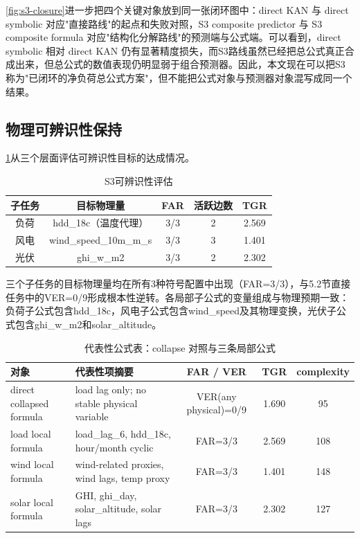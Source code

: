 \cref{fig:s3-closure}进一步把四个关键对象放到同一张闭环图中：direct KAN 与 direct symbolic 对应"直接路线"的起点和失败对照，S3 composite predictor 与 S3 composite formula 对应"结构化分解路线"的预测端与公式端。可以看到，direct symbolic 相对 direct KAN 仍有显著精度损失，而S3路线虽然已经把总公式真正合成出来，但总公式的数值表现仍明显弱于组合预测器。因此，本文现在可以把S3称为"已闭环的净负荷总公式方案"，但不能把公式对象与预测器对象混写成同一个结果。

\subsection{物理可辨识性保持}

\cref{tab:s3-identifiability}从三个层面评估可辨识性目标的达成情况。

\begin{table}[htbp]
\centering
\caption{S3可辨识性评估}
\label{tab:s3-identifiability}
\begin{tabular}{ccccc}
\toprule
子任务 & 目标物理量 & FAR & 活跃边数 & TGR \\
\midrule
负荷 & hdd\_18c（温度代理） & 3/3 & 2 & 2.569 \\
风电 & wind\_speed\_10m\_m\_s & 3/3 & 3 & 1.401 \\
光伏 & ghi\_w\_m2 & 3/3 & 2 & 2.302 \\
\bottomrule
\end{tabular}
\end{table}

三个子任务的目标物理量均在所有3种符号配置中出现（FAR=3/3），与5.2节直接任务中的VER=0/9形成根本性逆转。各局部子公式的变量组成与物理预期一致：负荷子公式包含hdd\_18c，风电子公式包含wind\_speed及其物理变换，光伏子公式包含ghi\_w\_m2和solar\_altitude。

\begin{table}[htbp]
\centering
\caption{代表性公式表：collapse 对照与三条局部公式}
\label{tab:representative-formulas}
\begin{tabularx}{\textwidth}{llccc}
\toprule
对象 & 代表性项摘要 & FAR / VER & TGR & complexity \\
\midrule
direct collapsed formula & load lag only; no stable physical variable & VER(any physical)=0/9 & 1.690 & 95 \\
load local formula & load\_lag\_6, hdd\_18c, hour/month cyclic & FAR=3/3 & 2.569 & 108 \\
wind local formula & wind-related proxies, wind lags, temp proxy & FAR=3/3 & 1.401 & 148 \\
solar local formula & GHI, ghi\_day, solar\_altitude, solar lags & FAR=3/3 & 2.302 & 127 \\
\bottomrule
\end{tabularx}
\end{table}

